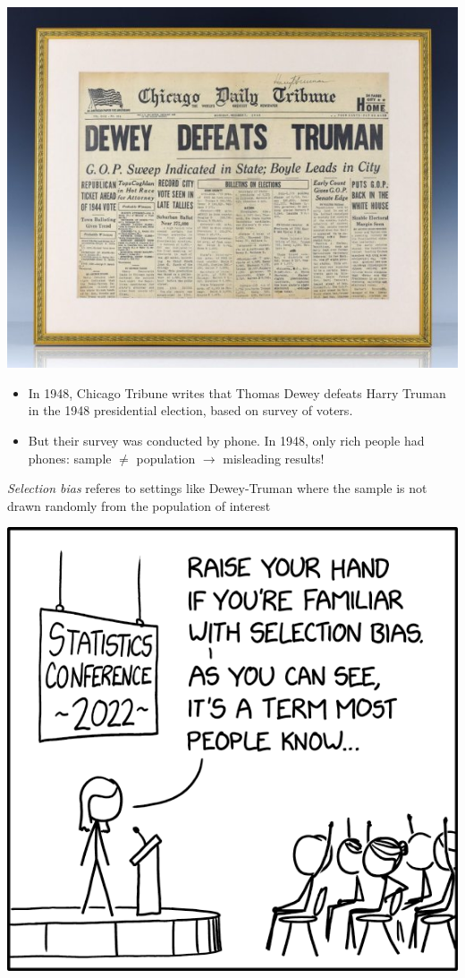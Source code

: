 \documentclass[11pt,english,handout]{beamer}
\begin{document}
\begin{frame}
\centering
\includegraphics[width = 0.7\linewidth]{dewey-defeats-truman}
\begin{itemize}
	\item 
	In 1948, Chicago Tribune writes that Thomas Dewey defeats Harry Truman in the 1948 presidential election, based on survey of voters.
	
	\pause
	\item
	But their survey was conducted by phone. In 1948, only rich people had phones: sample $\neq$ population $\rightarrow$ misleading results!
\end{itemize}

\end{frame}

\begin{frame}
\textit{Selection bias} referes to settings like Dewey-Truman where the sample is not drawn randomly from the population of interest

\includegraphics[width = 0.6\linewidth]{selection_bias_xkcd.png}
\end{frame}
\end{document}
